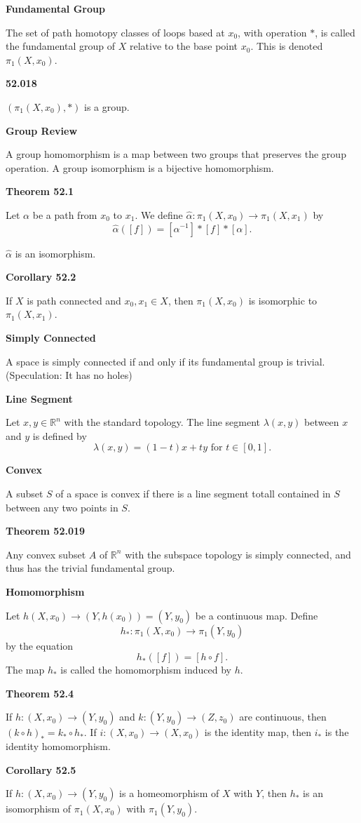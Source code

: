 \documentclass{article}
\begin{document}
\medskip\noindent\textbf{Fundamental Group}

    The set of path homotopy classes of loops based at $x_0$, with operation $*$, is called the fundamental group of $X$ relative to the base point $x_0$. This is denoted $\pi_1(X,x_0)$.

\medskip\noindent\textbf{52.018}

    $(\pi_1(X,x_0), *)$ is a group.

\medskip\noindent\textbf{Group Review}

    A group homomorphism is a map between two groups that preserves the group operation.
    A group isomorphism is a bijective homomorphism.

\medskip\noindent\textbf{Theorem 52.1}

    Let $\alpha$ be a path from $x_0$ to $x_1$. We define $\hat\alpha: \pi_1(X,x_0) \to \pi_1(X, x_1)$ by $$\hat\alpha([f]) = [\alpha^{-1}] * [f] * [\alpha].$$

    $\hat\alpha$ is an isomorphism.

\medskip\noindent\textbf{Corollary 52.2}

    If $X$ is path connected and $x_0, x_1 \in X$, then $\pi_1(X, x_0)$ is isomorphic to $\pi_1(X, x_1)$.

\medskip\noindent\textbf{Simply Connected}

    A space is simply connected if and only if its fundamental group is trivial. (Speculation: It has no holes)

\medskip\noindent\textbf{Line Segment}

    Let $x, y \in \mathbb R^n$ with the standard topology.
    The line segment $\lambda(x,y)$ between $x$ and $y$ is defined by $$\lambda(x, y) = (1-t)x+ty \text{ for } t \in [0, 1].$$

\medskip\noindent\textbf{Convex}

    A subset $S$ of a space is convex if there is a line segment totall contained in $S$ between any two points in $S$.

\medskip\noindent\textbf{Theorem 52.019}

    Any convex subset $A$ of $\mathbb R^n$ with the subspace topology is simply connected, and thus has the trivial fundamental group.

\medskip\noindent\textbf{Homomorphism}

    Let $h(X, x_0) \to (Y, h(x_0)) = (Y, y_0)$ be a continuous map.
    Define $$h_*: \pi_1(X, x_0) \to \pi_1(Y, y_0)$$ by the equation $$h_*([f]) = [h \circ f].$$
    The map $h_*$ is called the homomorphism induced by $h$.

\medskip\noindent\textbf{Theorem 52.4}

    If $h: (X, x_0) \to (Y, y_0)$ and $k: (Y, y_0) \to (Z, z_0)$ are continuous, then $(k \circ h)_* = k_* \circ h_*$.
    If  $i: (X, x_0) \to (X, x_0)$ is the identity map, then $i_*$ is the identity homomorphism.

\medskip\noindent\textbf{Corollary 52.5}

    If $h: (X, x_0) \to (Y, y_0)$ is a homeomorphism of $X$ with $Y$, then $h_*$ is an isomorphism of $\pi_1(X, x_0)$ with $\pi_1(Y, y_0)$.
\end{document}
